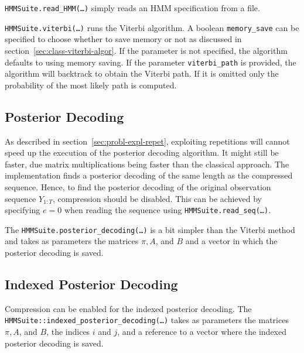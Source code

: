 \texttt{HMMSuite.read\_HMM(\dots)} simply reads an HMM specification from a
file.

\texttt{HMMSuite.viterbi(\dots)} runs the Viterbi algorithm. A boolean
\texttt{memory\_save} can be specified to choose whether to save memory or not
as discussed in section~\ref{sec:class-viterbi-algor}. If the parameter is not
specified, the algorithm defaults to using memory saving. If the parameter
\texttt{viterbi\_path} is provided, the algorithm will backtrack to obtain the
Viterbi path. If it is omitted only the probability of the most likely path is
computed.

\subsection{Posterior Decoding}

As described in section~\ref{sec:probl-expl-repet}, exploiting repetitions will
cannot speed up the execution of the posterior decoding algorithm. It might still
be faster, due matrix multiplications being faster than the classical
approach. The implementation finds a posterior decoding of the same length as
the compressed sequence. Hence, to find the posterior decoding of the original
observation sequence $Y_{1:T}$, compression should be disabled. This can be achieved by
specifying $e = 0$ when reading the sequence using
\texttt{HMMSuite.read\_seq(\dots)}.

The \texttt{HMMSuite.posterior\_decoding(\dots)} is a bit simpler than the
Viterbi method and takes as parameters the matrices $\pi, A$, and $B$ and a
vector in which the posterior decoding is saved.

\subsection{Indexed Posterior Decoding}

Compression can be enabled for the indexed posterior decoding. The
\texttt{HMMSuite::indexed\_posterior\_decoding(\dots)} takes as parameters the
matrices $\pi, A$, and $B$, the indices $i$ and $j$, and a reference to a vector
where the indexed posterior decoding is saved.

